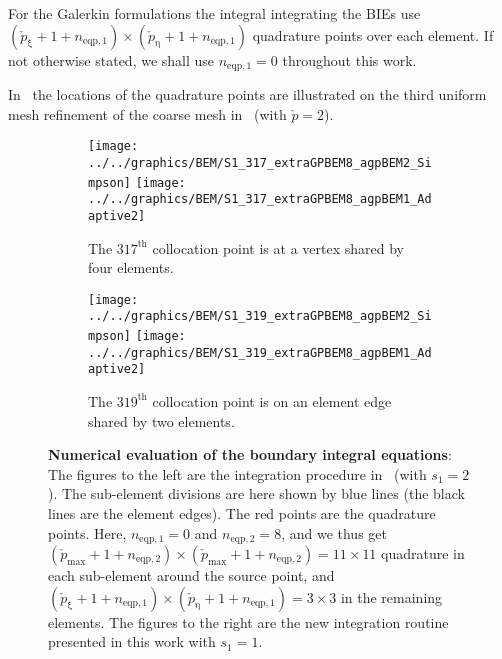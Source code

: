 For the Galerkin formulations the integral integrating the BIEs use $(\check{p}_\upxi+1+n_{\mathrm{eqp},1})\times(\check{p}_\upeta+1+n_{\mathrm{eqp},1})$ quadrature points over each element. If not otherwise stated, we shall use $n_{\mathrm{eqp},1}=0$ throughout this work.

In~ the locations of the quadrature points are illustrated on the third uniform mesh refinement of the coarse mesh in~ (with $\check{p}=2$). 
\begin{figure}
	\begin{subfigure}[t]{\textwidth}
		\centering
		\texttt{[image: ../../graphics/BEM/S1\_317\_extraGPBEM8\_agpBEM2\_Simpson]}%
		\hspace*{0.02\textwidth}%
		\texttt{[image: ../../graphics/BEM/S1\_317\_extraGPBEM8\_agpBEM1\_Adaptive2]}
		\caption{The $317^{\mathrm{th}}$ collocation point is at a vertex shared by four elements.}
	\end{subfigure}
	\par\bigskip
	\par\bigskip
	\begin{subfigure}[t]{\textwidth}
		\centering
		\texttt{[image: ../../graphics/BEM/S1\_319\_extraGPBEM8\_agpBEM2\_Simpson]}%
		\hspace*{0.02\textwidth}%
		\texttt{[image: ../../graphics/BEM/S1\_319\_extraGPBEM8\_agpBEM1\_Adaptive2]}
		\caption{The $319^{\mathrm{th}}$ collocation point is on an element edge shared by two elements.}
	\end{subfigure}
	\caption{\textbf{Numerical evaluation of the boundary integral equations}: The figures to the left are the integration procedure in~\cite{Simpson2014aib} (with $s_1=2$). The sub-element divisions are here shown by blue lines (the black lines are the element edges). The red points are the quadrature points. Here, $n_{\mathrm{eqp},1}=0$ and $n_{\mathrm{eqp},2}=8$, and we thus get $(\check{p}_{\mathrm{max}}+1+n_{\mathrm{eqp},2})\times(\check{p}_{\mathrm{max}}+1+n_{\mathrm{eqp},2})=11\times 11$ quadrature in each sub-element around the source point, and $(\check{p}_\upxi+1+n_{\mathrm{eqp},1})\times(\check{p}_\upeta+1+n_{\mathrm{eqp},1})=3\times 3$ in the remaining elements. The figures to the right are the new integration routine presented in this work with $s_1=1$.}
	\label{Fig3:Quadrature1}
\end{figure}
